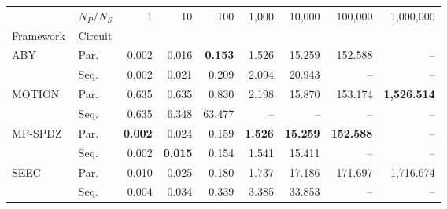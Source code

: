 \begin{tabular}{llrrrrrrr}
\toprule
 & $N_P$/$N_S$ & 1 & 10 & 100 & 1,000 & 10,000 & 100,000 & 1,000,000 \\
Framework & Circuit &  &  &  &  &  &  &  \\
\midrule
\multirow[c]{2}{*}{ABY~\cite{DSZ15}} & Par. & 0.002 & 0.016 & \bfseries 0.153 & 1.526 & 15.259 & 152.588 & -- \\
 & Seq. & 0.002 & 0.021 & 0.209 & 2.094 & 20.943 & -- & -- \\
\cline{1-9}
\multirow[c]{2}{*}{MOTION~\cite{BDST22}} & Par. & 0.635 & 0.635 & 0.830 & 2.198 & 15.870 & 153.174 & \bfseries 1,526.514 \\
 & Seq. & 0.635 & 6.348 & 63.477 & -- & -- & -- & -- \\
\cline{1-9}
\multirow[c]{2}{*}{MP-SPDZ~\cite{CCS:Keller20}} & Par. & \bfseries 0.002 & 0.024 & 0.159 & \bfseries 1.526 & \bfseries 15.259 & \bfseries 152.588 & -- \\
 & Seq. & 0.002 & \bfseries 0.015 & 0.154 & 1.541 & 15.411 & -- & -- \\
\cline{1-9}
\multirow[c]{2}{*}{SEEC} & Par. & 0.010 & 0.025 & 0.180 & 1.737 & 17.186 & 171.697 & 1,716.674 \\
 & Seq. & 0.004 & 0.034 & 0.339 & 3.385 & 33.853 & -- & -- \\
\bottomrule
\end{tabular}
